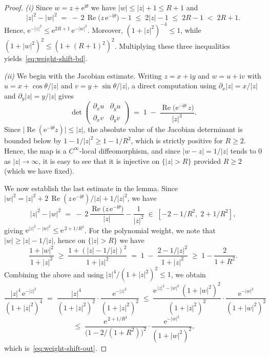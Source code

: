 \documentclass[a4paper,11pt,reqno]{amsart}
\numberwithin{equation}{section}
\theoremstyle{plain} %
\theoremstyle{definition} %
\theoremstyle{remark}
\newcommand{\abs}[1]{\lvert #1 \rvert}
\newcommand{\ee}{\mathrm{e}}
\newcommand{\ii}{\mathrm{i}}
\begin{document}
\begin{proof}
\emph{(i)}\;
Since $w = z+\ee^{\ii\theta}$ we have $\abs{w}\le \abs{z}+1\le R+1$ and
\[
\abs{z}^{2} - \abs{w}^{2}
\;=\; -\,2\,\operatorname{Re}\!\bigl(z\,\ee^{-\ii\theta}\bigr) - 1
\;\le\; 2\abs{z} - 1
\;\le\; 2R - 1
\;<\; 2R + 1.
\]
Hence,
$\ee^{-\abs{z}^{2}} \le \ee^{2R+1}\,\ee^{-\abs{w}^{2}}$. Moreover,
$(1+\abs{z}^{2})^{-4} \le 1$, while $(1+\abs{w}^{2})^{2} \le
(1+(R+1)^{2})^{2}$. Multiplying these three inequalities
yields~\eqref{eq:weight-shift-bd}.

\medskip

\emph{(ii)}\; We begin with the Jacobian estimate.
Writing $z = x+\ii y$ and $w = u + \ii v$ with $u = x +
\cos\theta/\abs{z}$ and $v = y + \sin\theta/\abs{z}$, a direct
computation using $\partial_{x}\abs{z} = x/\abs{z}$ and
$\partial_{y}\abs{z} = y/\abs{z}$ gives
\[
\det\!\begin{pmatrix} \partial_{x} u & \partial_{y} u \\
\partial_{x} v & \partial_{y} v \end{pmatrix}
\;=\;
1 \;-\; \frac{\operatorname{Re}\bigl(\ee^{-\ii\theta}\,z\bigr)}{\abs{z}^{3}}.
\]
Since $\abs{\operatorname{Re}(\ee^{-\ii\theta}z)} \le \abs{z}$, the
absolute value of the Jacobian determinant is bounded below by
$1 - 1/\abs{z}^{2} \ge 1 - 1/R^{2}$, which is strictly positive for
$R\ge 2$. Hence, the map is a $C^{\infty}$-local diffeomorphism, and
since $\abs{w-z} = 1/\abs{z}$ tends to $0$ as $\abs{z}\to\infty$, it is
easy to see that it is injective on $\{\abs{z}>R\}$ provided $R \ge 2$ (which we have
fixed).
\medskip

We now establish the last estimate in the lemma.
Since $\abs{w}^{2} = \abs{z}^{2} +
2\,\operatorname{Re}(z\,\ee^{-\ii\theta})/\abs{z} + 1/\abs{z}^{2}$, we have
\[
\abs{z}^{2} - \abs{w}^{2}
\;=\; -\,2\,\frac{\operatorname{Re}\bigl(z\,\ee^{-\ii\theta}\bigr)}{\abs{z}}
- \frac{1}{\abs{z}^{2}}
\;\in\; [-2 - 1/R^{2},\; 2 + 1/R^{2}],
\]
giving $\ee^{\abs{z}^{2}-\abs{w}^{2}} \le \ee^{\,2 + 1/R^{2}}$.
For the polynomial weight, we note that $\abs{w}\ge \abs{z} - 1/\abs{z}$, hence on
$\{\abs{z} > R\}$ we have
\[
\frac{1+\abs{w}^{2}}{1+\abs{z}^{2}}
\;\ge\;
\frac{1+(\abs{z}-1/\abs{z})^{2}}{1+\abs{z}^{2}}
\;=\;
1 \;-\; \frac{2 - 1/\abs{z}^{2}}{1+\abs{z}^{2}}
\;\ge\;
1 - \frac{2}{1+R^{2}}.
\]
Combining the above and using $\abs{z}^{4}/(1+\abs{z}^{2})^{2} \le 1$, we obtain
\[
\frac{\abs{z}^{4}\,\ee^{-\abs{z}^{2}}}{(1+\abs{z}^{2})^{4}}
\;=\;
\frac{\abs{z}^{4}}{(1+\abs{z}^{2})^{2}}\cdot
\frac{\ee^{-\abs{z}^{2}}}{(1+\abs{z}^{2})^{2}}
\;\le\;
\frac{\ee^{\,\abs{z}^{2}-\abs{w}^{2}}\,(1+\abs{w}^{2})^{2}}
{(1+\abs{z}^{2})^{2}}\cdot
\frac{\ee^{-\abs{w}^{2}}}{(1+\abs{w}^{2})^{2}} \]
\[
\;\le\;
\frac{\ee^{\,2 + 1/R^{2}}}{\bigl(1-2/(1+R^{2})\bigr)^{2}}\cdot
\frac{\ee^{-\abs{w}^{2}}}{(1+\abs{w}^{2})^{2}},
\]
which is~\eqref{eq:weight-shift-out}.
\end{proof}
\end{document}
